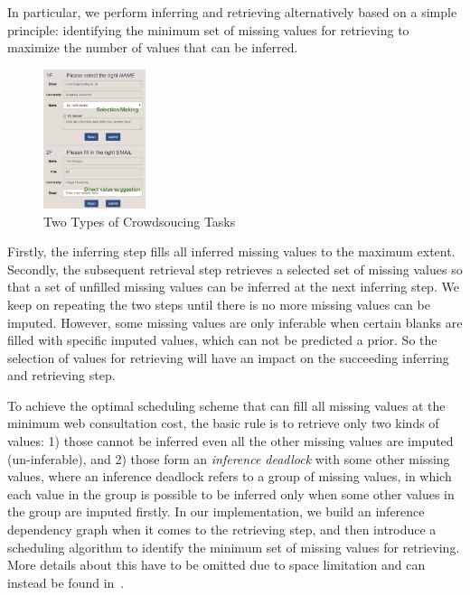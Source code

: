\documentclass[sigconf]{acmart}
\begin{document}
In particular, we perform inferring and retrieving alternatively based on a simple principle: identifying the minimum set of missing values for retrieving to maximize the number of values that can be inferred.

\begin{figure}%
  \setlength{\abovecaptionskip}{2pt}
  \centerline{\includegraphics[width=3cm]{images/crowd.eps}}
  \caption{\small Two Types of Crowdsoucing Tasks}
  \label{fig:crowdsource}
\end{figure}


{\color{red}Firstly, the inferring step fills all inferred missing values to the maximum extent. Secondly, the subsequent retrieval step retrieves a selected set of missing values so that a set of unfilled missing values can be inferred at the next inferring step. We keep on repeating the two steps until there is no more missing values can be imputed.}
%
However, some missing values are only inferable when certain blanks are filled with specific imputed values, which can not be predicted a prior. So the selection of values for retrieving will have an impact on the succeeding inferring and retrieving step.

To achieve the optimal scheduling scheme {\color{red}that can fill all missing values at the minimum web consultation cost}, the basic rule is to retrieve only two kinds of values: 1) those cannot be inferred even all the other missing values are imputed (un-inferable), and 2) those form an {\em inference deadlock} with some other missing values, where an inference deadlock refers to a group of missing values, in which each value in the group is possible to be inferred only when some other values in the group are imputed firstly.
%
In our implementation, we build an inference dependency graph when it comes to the retrieving step, and then introduce a scheduling algorithm to identify the minimum set of missing values for retrieving. More details about this have to be omitted due to space limitation and can instead be found in~\cite{li2015trip}.

\vspace{-10pt}
\end{document}
